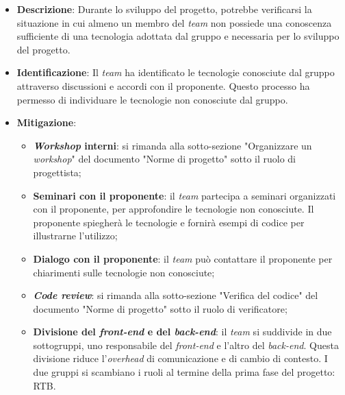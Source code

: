 \label{risk:conoscenza tecnologie carente}
\begin{itemize}
	\item \textbf{Descrizione}:
		Durante lo sviluppo del progetto, potrebbe verificarsi la situazione 
		in cui almeno un membro del \textit{team} non possiede una conoscenza 
		sufficiente di una tecnologia adottata dal gruppo e necessaria per 
		lo sviluppo del progetto.

	\item \textbf{Identificazione}: 
		Il \textit{team} ha identificato le tecnologie conosciute dal gruppo 
		attraverso discussioni e accordi con il proponente. 
		Questo processo ha permesso di individuare le tecnologie non conosciute dal gruppo.

	\item \textbf{Mitigazione}:
	      \begin{itemize}
		      \item \textbf{\textit{Workshop} interni}: si rimanda alla
		            sotto-sezione "Organizzare un \textit{workshop}" del
		            documento "Norme di progetto" sotto il ruolo di progettista;

		      \item \textbf{Seminari con il proponente}: il \textit{team}
		            partecipa a seminari organizzati con il proponente, per approfondire
		            le tecnologie non conosciute. 
					Il proponente spiegherà le tecnologie e fornirà esempi di codice
		            per illustrarne l'utilizzo;

		      \item \textbf{Dialogo con il proponente}: il \textit{team} può
		            contattare il proponente per chiarimenti sulle
		            tecnologie non conosciute;

		      \item \textbf{\textit{Code review}}: si rimanda alla sotto-sezione
		            "Verifica del codice" del documento "Norme di progetto"
		            sotto il ruolo di verificatore;

		      \item \textbf{Divisione del \textit{front-end} e del \textit{back-end}}: 
			  		il \textit{team} si suddivide in due sottogruppi, uno responsabile del 
					\textit{front-end} e l'altro del \textit{back-end}. 
					Questa divisione riduce l'\textit{overhead} di comunicazione e di cambio di
		            contesto. I due gruppi si scambiano i ruoli al termine della prima 
					fase del progetto: RTB.
	      \end{itemize}
	

\end{itemize}
